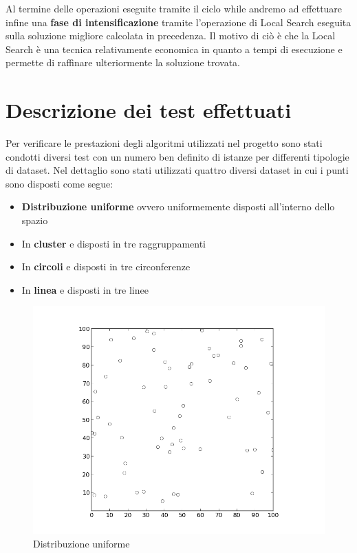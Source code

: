 \documentclass[preprint,12pt]{elsarticle}
\begin{document}
Al termine delle operazioni eseguite tramite il ciclo while andremo ad effettuare infine una \textbf{fase di intensificazione} tramite l'operazione di Local Search eseguita sulla soluzione migliore calcolata in precedenza. Il motivo di ciò è che la Local Search è una tecnica relativamente economica in quanto a tempi di esecuzione e permette di raffinare ulteriormente la soluzione trovata.


\section{Descrizione dei test effettuati}
\label{S:3}

Per verificare le prestazioni degli algoritmi utilizzati nel progetto sono stati condotti diversi test con un numero ben definito di istanze per differenti tipologie di dataset. Nel dettaglio sono stati utilizzati quattro diversi dataset in cui i punti sono disposti come segue:

\begin{itemize}
\item \textbf{Distribuzione uniforme} ovvero uniformemente disposti all'interno dello spazio
\item In \textbf{cluster} e disposti in tre raggruppamenti
\item In \textbf{circoli} e disposti in tre circonferenze
\item In \textbf{linea} e disposti in tre linee \\
\end{itemize}


\begin{figure}[htbp]
\centering
\includegraphics[scale=0.50]{grafici_istanze/random_60.png} 
\caption{Distribuzione uniforme}\label{fig:1}
\end{figure}
\end{document}
